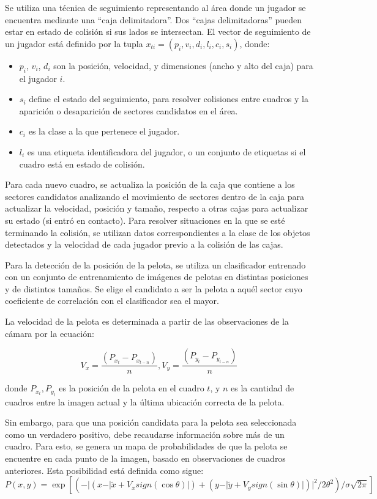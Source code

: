 \documentclass[a4paper,10pt]{article}
\begin{document}
Se utiliza una técnica de seguimiento representando al área donde un jugador se
encuentra mediante una ``caja delimitadora''.
Dos ``cajas delimitadoras'' pueden estar en estado de colisión si sus lados se
intersectan. El vector de seguimiento de un jugador está definido por la tupla
$x_{ti} = (p_i, v_i, d_i, l_i, c_i, s_i)$, donde:

\begin{itemize}
  \item $p_i$, $v_i$, $d_i$ son la posición, velocidad, y dimensiones
    (ancho y alto del caja) para el jugador $i$.
  \item $s_i$ define el estado del seguimiento, para resolver
    colisiones entre cuadros y la aparición o desaparición de
    sectores candidatos en el área.
  \item $c_i$ es la clase a la que pertenece el jugador.
  \item $l_i$ es una etiqueta identificadora del jugador, o un conjunto de
etiquetas si el cuadro está en estado de colisión.
\end{itemize}

Para cada nuevo cuadro, se actualiza la posición de la caja que contiene a
los sectores candidatos analizando el movimiento de sectores dentro de la
caja para actualizar la velocidad, posición y tamaño,
respecto a otras cajas para actualizar su estado (si entró en contacto).
Para resolver situaciones en la que se esté terminando la colisión, se utilizan
datos correspondientes a la clase de los objetos detectados y la velocidad de
cada jugador previo a la colisión de las cajas.

Para la detección de la posición de la pelota, se utiliza un clasificador
entrenado con un conjunto de entrenamiento de imágenes de pelotas en distintas
posiciones y de distintos tamaños. Se elige el candidato a ser la pelota a
aquél sector cuyo coeficiente de correlación con el clasificador sea el mayor.

La velocidad de la pelota es determinada a partir de las observaciones de la
cámara por la ecuación:

\[
  V_x = \frac{(P_{x_t} - P_{x_{t-n}})}{n}, V_y = \frac{(P_{y_t} - P_{y_{t-n}})}{n}
\]

donde $P_{x_t}, P_{y_t}$ es la posición de la pelota en el cuadro $t$, y $n$ es
la cantidad de cuadros entre la imagen actual y la última ubicación correcta de
la pelota.

Sin embargo, para que una posición candidata para la pelota sea seleccionada
como un verdadero positivo, debe recaudarse información sobre más de un cuadro.
Para esto, se genera un mapa de probabilidades de que la pelota se encuentre en
cada punto de la imagen, basado en observaciones de cuadros anteriores. Esta
posibilidad está definida como sigue:
\[
  P(x, y) = \exp \left[ (- \vert ( x - \vert \tilde{x} + V_x sign(\cos \theta) \vert )
  + ( y - \vert \tilde{y} + V_y sign(\sin \theta) \vert)\vert ^ 2 / 2\theta^2) /\sigma \sqrt{2\pi} \right]
\]
\end{document}

